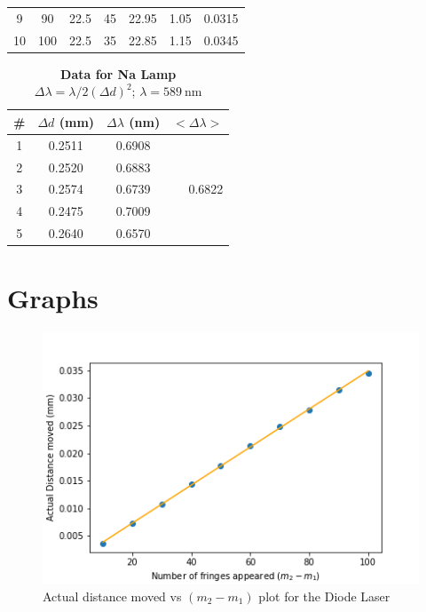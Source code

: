 \documentclass{article}
\begin{document}
\begin{table}[h!]
\begin{tabular}{ccccccc}
9      & 90                                                           & 22.5                                                                              & 45                                                                           & 22.95                                            & 1.05            & 0.0315                                 \\
10     & 100                                                          & 22.5                                                                              & 35                                                                           & 22.85                                            & 1.15            & 0.0345                                 \\ \hline
\hline
\end{tabular}
\label{Tab:diodeLaser}
\end{table}

\begin{table}[h!]
\centering
\caption{\textbf{Data for Na Lamp \\ $\Delta \lambda = \lambda / 2 ( \Delta d)^2$}; $\lambda = \SI{589}{\nano \metre}$}
\begin{tabular}{cccr}
\hline
\hline
\textbf{\#} & \boldmath $\Delta d$ (mm)  & \boldmath $\Delta \lambda$ (nm) & \multicolumn{1}{c}{\boldmath $<\Delta \lambda>$}  \\ \hline
\hline
1      & 0.2511 & 0.6908  & \multirow{5}{*}{0.6822} \\
2      & 0.2520 & 0.6883  &                              \\
3      & 0.2574 & 0.6739  &                              \\
4      & 0.2475 & 0.7009  &                              \\
5      & 0.2640 & 0.6570  &                              \\ \hline
\hline
\end{tabular}
\label{Tab:NaLamp}
\end{table}

\section{Graphs}
\begin{figure}[h!]
    \centering
    \includegraphics[scale = 0.5]{Figures/plot.png}
    \caption{Actual distance moved vs $(m_2-m_1)$ plot for the Diode Laser}
    \label{fig:laserplot}
\end{figure}
\end{document}
